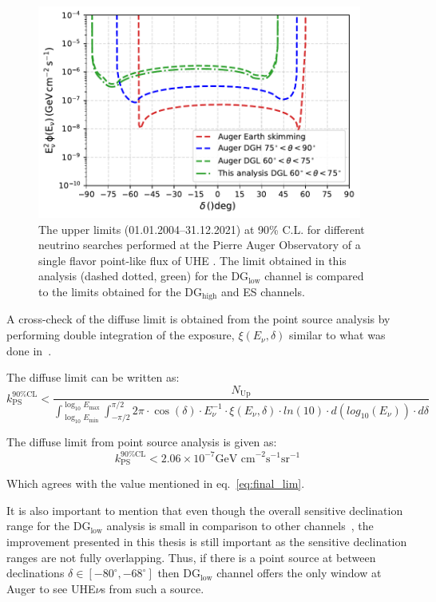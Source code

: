 \begin{figure}[ht]
  \centering
  
  \includegraphics[width=0.95\textwidth]{thesis_figures/PointLimits/Point_comp_combined_3.pdf}
  \caption{The upper limits  (01.01.2004–31.12.2021) at 90\% C.L. for different neutrino searches performed at the Pierre Auger Observatory of a single flavor point-like flux of UHE . The limit obtained in this analysis (dashed dotted, green) for the DG$_{\text{low}}$ channel is compared to the limits obtained for the DG$_{\text{high}}$ and ES channels.}
  \label{fig:Dec_limit_comb3}
\end{figure}

A cross-check of the diffuse limit is obtained from the point source analysis by performing double integration of the exposure, $\xi(E_{\nu}, \delta)$ similar to what was done in~\cite{gap_note_2013}.

The diffuse limit can be written as:
\begin{equation}
  k_{\text{PS}}^{90\% \text{CL}} < \frac{N_{\text{Up}}}{\int_{\log_{10}E_{\text{min}}}^{\log_{10}E_{\text{max}}} \int_{-\pi/2}^{\pi/2}2\pi \cdot \cos(\delta) \cdot E_{\nu}^{-1} \cdot \xi(E_{\nu}, \delta) \cdot ln(10) \cdot d(log_{10}(E_{\nu})) \cdot d\delta}
\end{equation}

The diffuse limit from point source analysis is given as: 
\begin{equation}
  k_{\text{PS}}^{90\%\text{CL}} < 2.06 \times 10^{-7} \text{GeV cm}^{-2} \text{s}^{-1} \text{sr}^{-1}
\end{equation}

Which agrees with the value mentioned in eq.~\ref{eq:final_lim}.

It is also important to mention that even though the overall sensitive declination range for the DG$_{\text{low}}$ analysis is small in comparison to other channels~\cite{Aab_2019_point}, the improvement presented in this thesis is still important as the sensitive declination ranges are not fully overlapping. Thus, if there is a point source at between declinations $ \delta \in [-80^{\circ}, -68^{\circ}]$ then DG$_{\text{low}}$ channel offers the only window at Auger to see UHE$\nu$s from such a source.  

